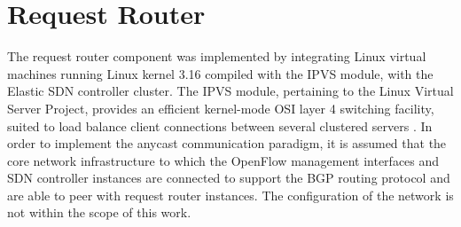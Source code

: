 \section{Request Router}
\label{section:request-router-implementation}
The request router component was implemented by integrating Linux virtual machines running Linux kernel 3.16 compiled with the \gls{IPVS} module, with the Elastic \gls{SDN} controller cluster.
The \gls{IPVS} module, pertaining to the Linux Virtual Server Project, provides an efficient kernel-mode \gls{OSI} layer 4 switching facility, suited to load balance client connections between several clustered servers \cite{LVS}.
In order to implement the \gls{anycast} communication paradigm, it is assumed that the core network infrastructure to which the OpenFlow management interfaces and \gls{SDN} controller instances are connected to support the \gls{BGP} routing protocol and are able to peer with request router instances.
The configuration of the network is not within the scope of this work.
%
